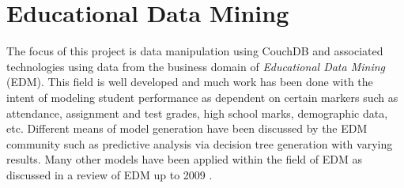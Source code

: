 \section{Educational Data Mining}
The focus of this project is data manipulation using CouchDB and associated technologies using data from the business domain of \textit{Educational Data Mining} (EDM). This field is well developed and much work has been done with the intent of modeling student performance as dependent on certain markers such as attendance, assignment and test grades, high school marks, demographic data, etc. Different means of model generation have been discussed by the EDM community such as predictive analysis via decision tree generation \cite{Qasem20016,Balestra2017,casper2017,Dimitris,zebun2005,Mierle:2005} with varying results. Many other models have been applied within the field of EDM as discussed in a review of EDM up to 2009 \cite{bakerEdMiningSummary}.
